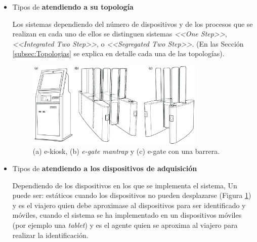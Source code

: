 \begin{itemize}
Los sistemas  pueden clasificarse dependiendo de los documentos que puede procesar: \gls{e-passport}, \gls{nacional-ID}\footnote{Algunos países de la , como España o Alemania disponen de documentos de identificación  \gls{eID}, con información biométrica del propietario y que son válidos para el cruce de fronteras.}, \Gls{visa}\footnote{En la  el documento  es un documento de viaje obligatorio en para muchos países fuera del acuerdo \gls{Schengen}.}. 

\item
Tipos de  \textbf{atendiendo a su topología}

Los sistemas  dependiendo del número de dispositivos y de los procesos que se realizan en cada uno de ellos se distinguen sistemas  \textit{<<One Step>>}, \textit{<<Integrated Two Step>>}, o \textit{<<Segregated Two Step>>}. (En las Sección \ref{subsec:Topologias} se explica en detalle cada una de las topologías). 

\begin{figure}
 \centering
     \includegraphics[width=0.8\textwidth]{ch-sistemasABC/images/ch-SistemasABC/dispositivosABCEstaticos.png}
     \caption{(a) \gls{e-kiosk}, (b) \textit{e-gate mantrap} y (c) \gls{e-gate} con una barrera.}
    \label{fig:dispositivosABCEstaticos}
\end{figure}

\item
Tipos de  \textbf{atendiendo a los dispositivos de adquisición}

Dependiendo de los dispositivos en los que se implementa el sistema, Un  puede ser:  estáticos cuando los dispositivos no pueden desplazarse (Figura \ref{fig:dispositivosABCEstaticos}) y es el viajero quien debe aproximase al dispositivos para ser identificado y  móviles, cuando el sistema se ha implementado en un dispositivos móviles (por ejemplo una \textit{tablet}) y es el agente quien se aproxima al viajero para realizar la identificación.


\end{itemize}
